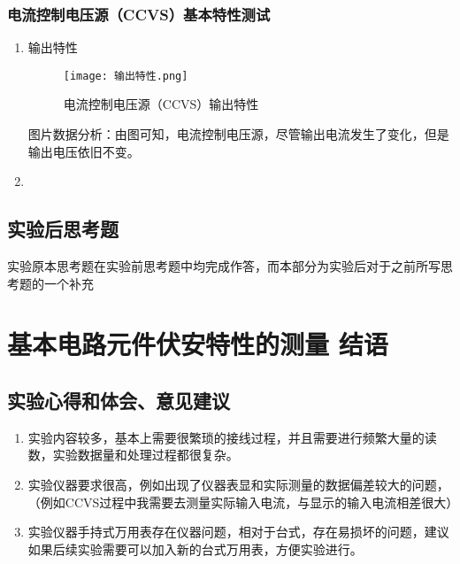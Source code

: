 \documentclass[dvipsnames, svgnames,a4paper,11pt]{article}
\begin{document}
		\subsubsection{电流控制电压源（CCVS）基本特性测试}
	\begin{enumerate}
			\begin{figure}[H]
			\centering
			\texttt{[image: 接线总览.jpg]}
			\caption{实验接线总览}
			\label{接线总览}
		\end{figure}
		\item 输出特性
		
		\begin{figure}[H]
			\centering
			\texttt{[image: 输出特性.png]}
			\caption{电流控制电压源（CCVS）输出特性}
			\label{输出特性}
		\end{figure}
		图片数据分析：由图可知，电流控制电压源，尽管输出电流发生了变化，但是输出电压依旧不变。
		\item 
		
	
	\end{enumerate}

	\subsection{实验后思考题}
	实验原本思考题在实验前思考题中均完成作答，而本部分为实验后对于之前所写思考题的一个补充
	\begin{question}
		
	\end{question}
	
	
	
	\clearpage
	
	\section{基本电路元件伏安特性的测量 \quad\heiti 结语}
	
	\subsection{实验心得和体会、意见建议}
	\begin{enumerate}
		\item 实验内容较多，基本上需要很繁琐的接线过程，并且需要进行频繁大量的读数，实验数据量和处理过程都很复杂。
		\item 实验仪器要求很高，例如出现了仪器表显和实际测量的数据偏差较大的问题，（例如CCVS过程中我需要去测量实际输入电流，与显示的输入电流相差很大）
		\item 实验仪器手持式万用表存在仪器问题，相对于台式，存在易损坏的问题，建议如果后续实验需要可以加入新的台式万用表，方便实验进行。
	\end{enumerate}
	
\end{document}
